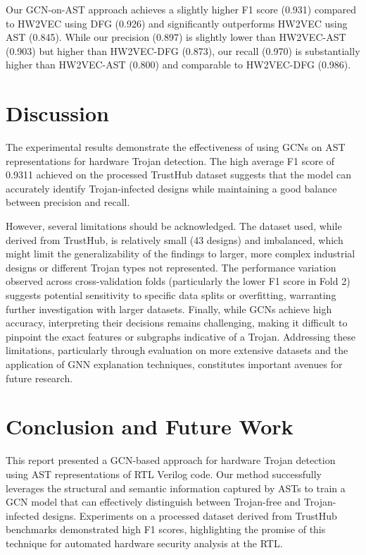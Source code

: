 \documentclass[sigplan,screen]{acmart}
\begin{document}
Our GCN-on-AST approach achieves a slightly higher F1 score (0.931) compared to HW2VEC using DFG (0.926) and significantly outperforms HW2VEC using AST (0.845). While our precision (0.897) is slightly lower than HW2VEC-AST (0.903) but higher than HW2VEC-DFG (0.873), our recall (0.970) is substantially higher than HW2VEC-AST (0.800) and comparable to HW2VEC-DFG (0.986). 


\section{Discussion}
The experimental results demonstrate the effectiveness of using GCNs on AST representations for hardware Trojan detection. The high average F1 score of 0.9311 achieved on the processed TrustHub dataset suggests that the model can accurately identify Trojan-infected designs while maintaining a good balance between precision and recall. 

However, several limitations should be acknowledged. The dataset used, while derived from TrustHub, is relatively small (43 designs) and imbalanced, which might limit the generalizability of the findings to larger, more complex industrial designs or different Trojan types not represented. The performance variation observed across cross-validation folds (particularly the lower F1 score in Fold 2) suggests potential sensitivity to specific data splits or overfitting, warranting further investigation with larger datasets. Finally, while GCNs achieve high accuracy, interpreting their decisions remains challenging, making it difficult to pinpoint the exact features or subgraphs indicative of a Trojan. Addressing these limitations, particularly through evaluation on more extensive datasets and the application of GNN explanation techniques, constitutes important avenues for future research.

\section{Conclusion and Future Work}
This report presented a GCN-based approach for hardware Trojan detection using AST representations of RTL Verilog code. Our method successfully leverages the structural and semantic information captured by ASTs to train a GCN model that can effectively distinguish between Trojan-free and Trojan-infected designs. Experiments on a processed dataset derived from TrustHub benchmarks demonstrated high F1 scores, highlighting the promise of this technique for automated hardware security analysis at the RTL.
\end{document}
